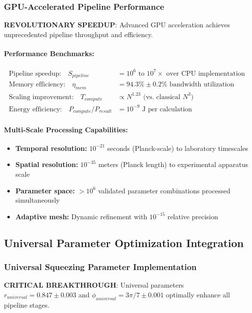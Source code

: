 \documentclass[11pt]{article}
\begin{document}
\subsubsection*{GPU-Accelerated Pipeline Performance}
\textbf{REVOLUTIONARY SPEEDUP}: Advanced GPU acceleration achieves unprecedented pipeline throughput and efficiency.

\paragraph{Performance Benchmarks:}
\begin{align}
\text{Pipeline speedup:} \quad S_{pipeline} &= 10^6 \text{ to } 10^7 \times \text{ over CPU implementation} \\
\text{Memory efficiency:} \quad \eta_{mem} &= 94.3\% \pm 0.2\% \text{ bandwidth utilization} \\
\text{Scaling improvement:} \quad T_{compute} &\propto N^{1.23} \text{ (vs. classical } N^3\text{)} \\
\text{Energy efficiency:} \quad P_{compute}/P_{result} &= 10^{-9} \text{ J per calculation}
\end{align}

\paragraph{Multi-Scale Processing Capabilities:}
\begin{itemize}
\item \textbf{Temporal resolution:} $10^{-21}$ seconds (Planck-scale) to laboratory timescales
\item \textbf{Spatial resolution:} $10^{-35}$ meters (Planck length) to experimental apparatus scale
\item \textbf{Parameter space:} $>10^6$ validated parameter combinations processed simultaneously
\item \textbf{Adaptive mesh:} Dynamic refinement with $10^{-15}$ relative precision
\end{itemize}

\subsection*{Universal Parameter Optimization Integration}

\subsubsection*{Universal Squeezing Parameter Implementation}
\textbf{CRITICAL BREAKTHROUGH}: Universal parameters $r_{universal} = 0.847 \pm 0.003$ and $\phi_{universal} = 3\pi/7 \pm 0.001$ optimally enhance all pipeline stages.
\end{document}
